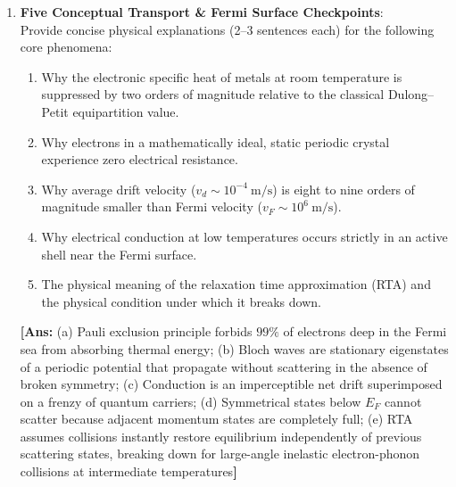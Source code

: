 \documentclass[11pt,a4paper]{article}
\begin{document}
\begin{enumerate}[label=\textbf{\arabic*.}, resume, leftmargin=*]
    \item \textbf{Five Conceptual Transport \& Fermi Surface Checkpoints}:\\
    Provide concise physical explanations (2--3 sentences each) for the following core phenomena:
    \begin{enumerate}[label=(\alph*)]
        \item Why the electronic specific heat of metals at room temperature is suppressed by two orders of magnitude relative to the classical Dulong--Petit equipartition value.
        \item Why electrons in a mathematically ideal, static periodic crystal experience zero electrical resistance.
        \item Why average drift velocity ($v_d \sim 10^{-4}\ \mathrm{m/s}$) is eight to nine orders of magnitude smaller than Fermi velocity ($v_F \sim 10^6\ \mathrm{m/s}$).
        \item Why electrical conduction at low temperatures occurs strictly in an active shell near the Fermi surface.
        \item The physical meaning of the relaxation time approximation (RTA) and the physical condition under which it breaks down.
    \end{enumerate}
    \textbf{[Ans:} (a) Pauli exclusion principle forbids $99\%$ of electrons deep in the Fermi sea from absorbing thermal energy; (b) Bloch waves are stationary eigenstates of a periodic potential that propagate without scattering in the absence of broken symmetry; (c) Conduction is an imperceptible net drift superimposed on a frenzy of quantum carriers; (d) Symmetrical states below $E_F$ cannot scatter because adjacent momentum states are completely full; (e) RTA assumes collisions instantly restore equilibrium independently of previous scattering states, breaking down for large-angle inelastic electron-phonon collisions at intermediate temperatures\textbf{]}


\end{enumerate}
\end{document}

